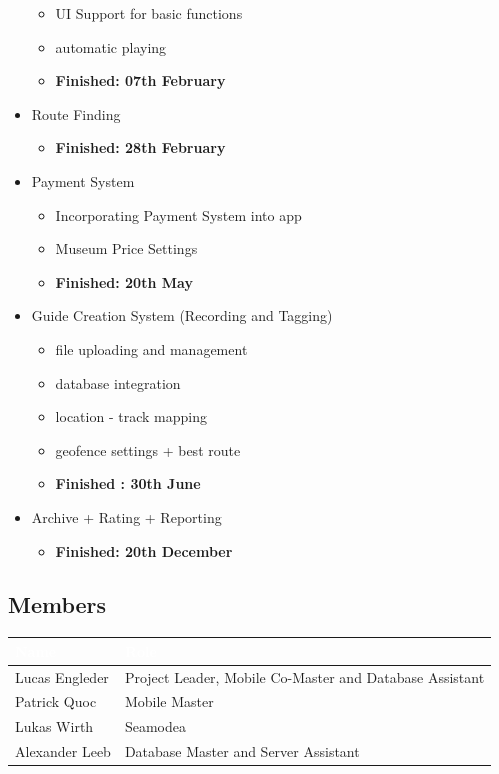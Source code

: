\documentclass[12pt]{article}
\theoremstyle{definition}
\begin{document}
\begin{itemize}
\begin{itemize}
    \item UI Support for basic functions
    \item automatic playing
    \item \textbf{Finished: 07th February}
\end{itemize}
\item Route Finding
\begin{itemize}
    \normalsize
    \item \textbf{ Finished: 28th February }
\end{itemize}
\item Payment System
\begin{itemize}
    \normalsize
    \item Incorporating Payment System into app
    \item Museum Price Settings
    \item \textbf{Finished: 20th May}
\end{itemize}
\item Guide Creation System (Recording and Tagging)
\begin{itemize}
    \normalsize
    \item file uploading and management
    \item database integration
    \item location - track mapping
    \item geofence settings + best route
    \item \textbf{Finished : 30th June}
\end{itemize} 
\item Archive + Rating + Reporting
\begin{itemize}
    \normalsize
    \item \textbf{Finished: 20th December}
\end{itemize}
\end{itemize}

\subsection{Members}
\begin{tabular}{|l|l|}
\hline
\cellcolor[gray]{0.5}\textcolor{white}{Name} & \cellcolor[gray]{0.5}\textcolor{white}{Role}\\ \hline
Lucas Engleder & Project Leader, Mobile Co-Master and Database Assistant\\ \hline
Patrick Quoc & Mobile Master\\ \hline
Lukas Wirth & Seamodea \\  \hline
Alexander Leeb & Database Master and Server Assistant \\ \hline
\end{tabular}
\end{document}
